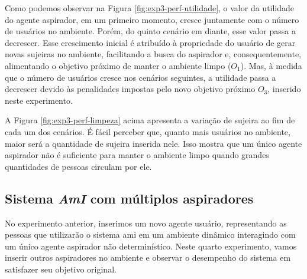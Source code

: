 Como podemos observar na Figura \ref{fig:exp3-perf-utilidade}, o valor da utilidade do agente aspirador, em um primeiro momento, cresce juntamente com o número de usuários no ambiente. Porém, do quinto cenário em diante, esse valor passa a decrescer. Esse crescimento inicial é atribuído à propriedade do usuário de gerar novas sujeiras no ambiente, facilitando a busca do aspirador e, consequentemente, alimentando o objetivo próximo de manter o ambiente limpo ($O_1$). Mas, à medida que o número de usuários cresce nos cenários seguintes, a utilidade passa a decrescer devido às penalidades impostas pelo novo objetivo próximo $O_3$, inserido neste experimento. 

\begin{figure}[h!]
    \centering
\end{figure}

A Figura \ref{fig:exp3-perf-limpeza} acima apresenta a variação de sujeira ao fim de cada um dos cenários. É fácil perceber que, quanto mais usuários no ambiente, maior será a quantidade de sujeira inserida nele. Isso mostra que um único agente aspirador não é suficiente para manter o ambiente limpo quando grandes quantidades de pessoas circulam por ele.

\subsection{Sistema \textit{AmI} com múltiplos aspiradores}
\label{sec:multi-asp}
No experimento anterior, inserimos um novo agente usuário, representando as pessoas que utilizarão o sistema \acrshort{ami} em um ambiente dinâmico interagindo com um único agente aspirador não determinístico. Neste quarto experimento, vamos inserir outros aspiradores no ambiente e observar o desempenho do sistema em satisfazer seu objetivo original. 

